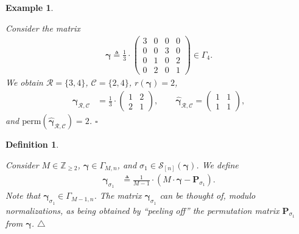 \documentclass[journal,lettersize,twocolumn]{IEEEtran} %
\newtheorem{example}[theorem]{Example}
\newtheorem{definition}[theorem]{Definition}
\newcommand{\edefinition}{\hfill$\triangle$}
\newcommand{\eexample}{\hfill$\square$}
\newcommand{\vect}[1]{ \bm{#1} }
\newcommand{\set}[1]{\mathcal{#1}}
\newcommand{\vgam}{ \vect{\gamma} }
\newcommand{\sZ}{\mathbb{Z}}
\newcommand{\matr}[1]{ \bm{#1} }
\newcommand{\defeq}{ \triangleq }
\newcommand{\perm}{ \mathrm{perm} }
\newcommand{\setC}{\set{C}}
\newcommand{\setR}{\set{R}}
\newcommand{\setS}{\set{S}}
\newcommand{\vgamRCp}{\vgam_{\setR,\setC}}
\newcommand{\mP}{\matr{P}}
\newcommand{\hvgamRCp}{ \hat{\vgam}_{\setR,\setC} }
\begin{document}
\begin{example}
  \label{example:vgam:1:1}

  Consider the matrix
  \begin{align*}
    \vgam 
       \defeq
         \frac{1}{3}
         \cdot
         \begin{pmatrix}
           3 & 0 & 0 & 0 \\
           0 & 0 & 3 & 0 \\
           0 & 1 & 0 & 2 \\
           0 & 2 & 0 & 1
         \end{pmatrix}
           \in \Gamma_4.
  \end{align*}
  We obtain $\setR = \{ 3, 4 \}$, $\setC = \{ 2, 4 \}$, $r(\vgam) =
  2$, 
  \begin{align*}
    \vgamRCp
      &= \frac{1}{3}
         \cdot
         \begin{pmatrix}
           1 & 2 \\
           2 & 1
         \end{pmatrix},
    \qquad
    \hvgamRCp
       = \begin{pmatrix}
           1 & 1 \\
           1 & 1
         \end{pmatrix},
  \end{align*}
  and $\perm(\hvgamRCp) = 2$.
  \eexample
\end{example}

%

\begin{definition}    
  \label{sec:1:def:10:part:2:add}

  Consider $M \in \sZ_{\geq 2}$, $ \vgam \in \Gamma_{M,n} $, and
  $ \sigma_1 \in \setS_{[n]}(\vgam) $. We define
  \begin{align*}
    \vgam_{\sigma_1}
      &\defeq
         \frac{1}{M-1} 
         \cdot
         \left( M \cdot \vgam - \mP_{\sigma_1} \right).
  \end{align*}
  Note that $ \vgam_{\sigma_1} \in \Gamma_{M-1,n} $. The matrix
  $\vgam_{\sigma_1}$ can be thought of, modulo normalizations, as being
  obtained by ``peeling off'' the permutation matrix $\mP_{\sigma_1}$ from
  $\vgam$.
  \edefinition
\end{definition}

%
\end{document}
